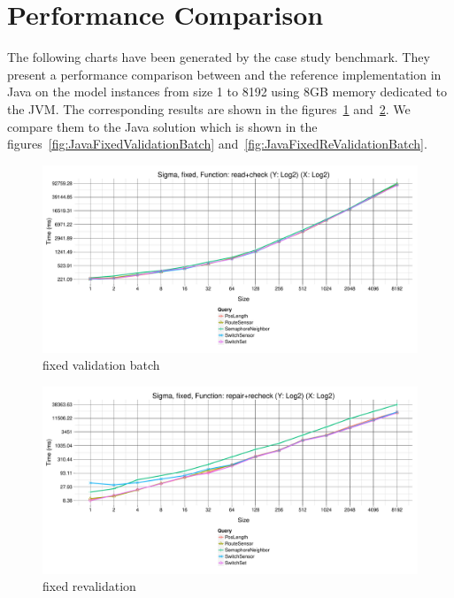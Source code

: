 \section{Performance Comparison}
\label{sec:PerformanceComparison}

The following charts have been generated by the case study benchmark.
They present a performance comparison between \SIGMA and the reference implementation in Java on the model instances from size 1 to 8192 using 8GB memory dedicated to the JVM.
The corresponding results are shown in the figures~\ref{fig:SigmaFixedValidationBatch} and~\ref{fig:SigmaFixedReValidationBatch}.
We compare them to the Java solution which is shown in the figures~\ref{fig:JavaFixedValidationBatch} and~\ref{fig:JavaFixedReValidationBatch}.

\begin{figure}[h!tb]
  \centering
  \includegraphics[width=\textwidth]{figures/fixed-Sigma-GroupBy-Query-time-batch-validation.pdf}
  \caption{\SIGMA fixed validation batch}
  \label{fig:SigmaFixedValidationBatch}
\end{figure}

\begin{figure}[h!tb]
  \centering
  \includegraphics[width=\textwidth]{figures/fixed-Sigma-GroupBy-Query-time-revalidation.pdf}
  \caption{\SIGMA fixed revalidation}
  \label{fig:SigmaFixedReValidationBatch}
\end{figure}

